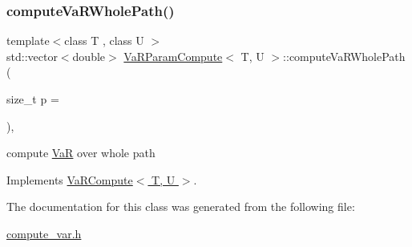 \subsubsection{\texorpdfstring{compute\+Va\+R\+Whole\+Path()}{computeVaRWholePath()}}
{\footnotesize\ttfamily template$<$class T , class U $>$ \\
std\+::vector$<$double$>$ \hyperlink{classVaRParamCompute}{Va\+R\+Param\+Compute}$<$ T, U $>$\+::compute\+Va\+R\+Whole\+Path (\begin{DoxyParamCaption}\item[{size\+\_\+t}]{p = {} }\end{DoxyParamCaption})\hspace{0.3cm}{\ttfamily [inline]}, {\ttfamily [virtual]}}



compute \hyperlink{classVaR}{VaR} over whole path 



Implements \hyperlink{classVaRCompute_ad5ec9feb42ea2f99f2c91e793d18fe1b}{Va\+R\+Compute$<$ T, U $>$}.



The documentation for this class was generated from the following file\+:\begin{DoxyCompactItemize}
\item 
\hyperlink{compute__var_8h}{compute\+\_\+var.\+h}\end{DoxyCompactItemize}
